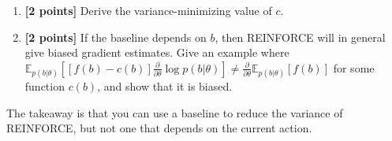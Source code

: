 \documentclass{harvardml}
\newcommand{\E}{\mathbb{E}}
\newcommand{\PT}{\frac{\partial}{\partial \theta}}
\theoremstyle{plain}
\begin{document}
\begin{problem}
\begin{enumerate}[label=(\alph*)]
\item {\bf [2 points]} Derive the variance-minimizing value of $c$.

\item {\bf [2 points]} If the baseline depends on $b$, then REINFORCE will in general give biased gradient estimates.
Give an example where $\E_{p(b|\theta)} \left[ [f(b) - c(b)] \PT \log p(b | \theta) \right] \neq \PT \E_{p(b|\theta)}\left[ f(b) \right]$ for some function $c(b)$, and show that it is biased.
\end{enumerate}

The takeaway is that you can use a baseline to reduce the variance of REINFORCE, but not one that depends on the current action.
\end{problem}



\end{document}
